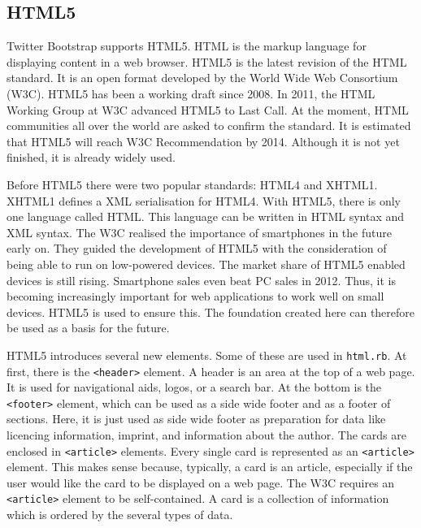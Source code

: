 \subsection{HTML5}
Twitter Bootstrap supports HTML5. HTML is the markup language for displaying content in a web browser. HTML5 is the latest revision of the HTML standard. It is an open format developed by the World Wide Web Consortium (W3C). HTML5 has been a working draft since 2008. In 2011, the HTML Working Group at W3C advanced HTML5 to Last Call. At the moment, HTML communities all over the world are asked to confirm the standard.  It is estimated that HTML5 will reach W3C Recommendation by 2014.\cite{html:lastcall} Although it is not yet finished, it is already widely used.

Before HTML5 there were two popular standards: HTML4 and XHTML1. XHTML1 defines a XML serialisation for HTML4. With HTML5, there is only one language called HTML. This language can be written in HTML syntax and XML syntax. 
\cite{html:5differences} The W3C realised the importance of smartphones in the future early on. They guided the development of HTML5 with the consideration of being able to run on low-powered devices. The market share of HTML5 enabled devices is still rising. \cite{smartphonesales} Smartphone sales even beat PC sales in 2012. Thus, it is becoming increasingly important for web applications to work well on small devices. HTML5 is used to ensure this. The foundation created here can therefore be used as a basis for the future.

HTML5 introduces several new elements. Some of these are used in \texttt{html.rb}. At first, there is the \lstinline{<header>} element. A header is an area at the top of a web page. It is used for navigational aids, logos, or a search bar. \cite{html5:header} At the bottom is the \lstinline{<footer>} element, which can be used as a side wide footer and as a footer of sections. \cite{html5:footer} Here, it is just used as side wide footer as preparation for data like licencing information, imprint, and information about the author. The cards are enclosed in \lstinline{<article>} elements. Every single card is represented as an \lstinline{<article>} element. This makes sense because, typically, a card is an article, especially if the user would like the card to be displayed on a web page. The W3C requires an \lstinline{<article>} element to be self-contained. \cite{html5:article} A card is a collection of information which is ordered by the several types of data. 

